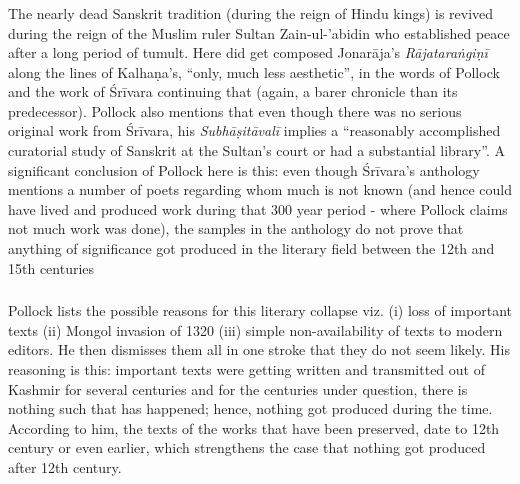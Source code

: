\subsubsection{} The nearly dead Sanskrit tradition (during the reign of Hindu kings) is revived during the reign of the Muslim ruler Sultan Zain-ul-'abidin who established peace after a long period of tumult. Here did get composed Jonarāja’s {\sl Rājataraṅgiṇī} along the lines of Kalhaṇa’s, “only, much less aesthetic”, in the words of Pollock and the work of Śrīvara continuing that (again, a barer chronicle than its predecessor). Pollock also mentions that even though there was no serious original work from Śrīvara, his {\sl Subhāṣitāvalī} implies a “reasonably accomplished curatorial study of Sanskrit at the Sultan’s court or had a substantial library”. A significant conclusion of Pollock here is this: even though Śrīvara’s anthology mentions a number of poets regarding whom much is not known (and hence could have lived and produced work during that 300 year period - where Pollock claims not much work was done), the samples in the anthology do not prove that anything of significance got produced in the literary field between the 12th and 15th centuries

\subsubsection{} Pollock lists the possible reasons for this literary collapse viz. (i) loss of important texts (ii) Mongol invasion of 1320 (iii) simple non-availability of texts to modern editors. He then dismisses them all in one stroke that they do not seem likely. His reasoning is this: important texts were getting written and transmitted out of Kashmir for several centuries and for the centuries under question, there is nothing such that has happened; hence, nothing got produced during the time. According to him, the texts of the works that have been preserved, date to 12th century or even earlier, which strengthens the case that nothing got produced after 12th century.

